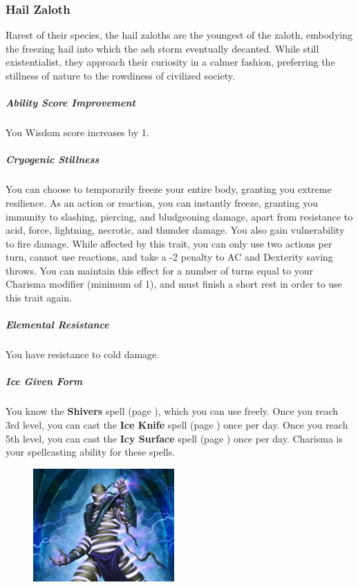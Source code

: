 \subsubsection{Hail Zaloth}
    Rarest of their species, the hail zaloths are the youngest of the zaloth, embodying the freezing hail into which the ash storm eventually decanted.
    While still existentialist, they approach their curiosity in a calmer fashion, preferring the stillness of nature to the rowdiness of civilized society.

    \subparagraph{Ability Score Improvement}
        You Wisdom score increases by 1.

    \subparagraph{Cryogenic Stillness}
        You can choose to temporarily freeze your entire body, granting you extreme resilience.
        As an action or reaction, you can instantly freeze, granting you immunity to slashing, piercing, and bludgeoning damage, apart from resistance to acid, force, lightning, necrotic, and thunder damage.
        You also gain vulnerability to fire damage.
        While affected by this trait, you can only use two actions per turn, cannot use reactions, and take a -2 penalty to AC and Dexterity saving throws.
        You can maintain this effect for a number of turns equal to your Charisma modifier (minimum of 1), and must finish a short rest in order to use this trait again.

    \subparagraph{Elemental Resistance}
        You have resistance to cold damage.

    \subparagraph{Ice Given Form}
        You know the \textbf{Shivers} spell (page \pageref{spell::shivers}), which you can use freely.
        Once you reach 3rd level, you can cast the \textbf{Ice Knife} spell (page \pageref{spell::iceknife}) once per day.
        Once you reach 5th level, you can cast the \textbf{Icy Surface} spell (page \pageref{spell::icysurface}) once per day.
        Charisma is your spellcasting ability for these spells.

\begin{figure}[!b]
    \centering
    \includegraphics[width=0.48\textwidth]{04kins/img/20zaloth_thunder.jpg}
\end{figure}

\newpage

